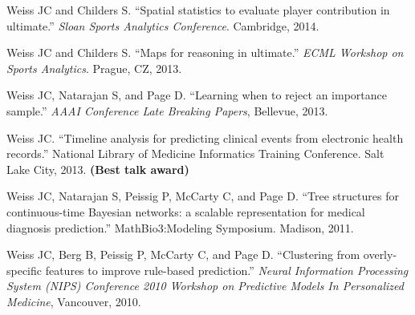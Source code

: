 \begin{bibsection}


\item  Weiss JC and Childers S. ``Spatial statistics to evaluate player contribution in ultimate.'' \textit{Sloan Sports Analytics Conference}. Cambridge, 2014.

\item  Weiss JC and Childers S. ``Maps for reasoning in ultimate.'' \textit{ECML Workshop on Sports Analytics}. Prague, CZ, 2013.

\item  Weiss JC, Natarajan S, and Page D. ``Learning when to reject an importance sample.'' \textit{AAAI Conference Late Breaking Papers}, Bellevue, 2013.

\item  Weiss JC. ``Timeline analysis for predicting clinical events from electronic health records.'' National Library of Medicine Informatics Training Conference. Salt Lake City, 2013. \textbf{(Best talk award)}

\item  Weiss JC, Natarajan S, Peissig P, McCarty C, and Page D. ``Tree structures for continuous-time Bayesian networks: a scalable representation for medical diagnosis prediction.'' MathBio3:Modeling Symposium. Madison, 2011.

\item  Weiss JC, Berg B, Peissig P, McCarty C, and Page D. ``Clustering from overly-specific features to improve rule-based prediction.'' \textit{Neural Information Processing System (NIPS) Conference 2010 Workshop on Predictive Models In Personalized Medicine}, Vancouver, 2010.
 
\end{bibsection}


